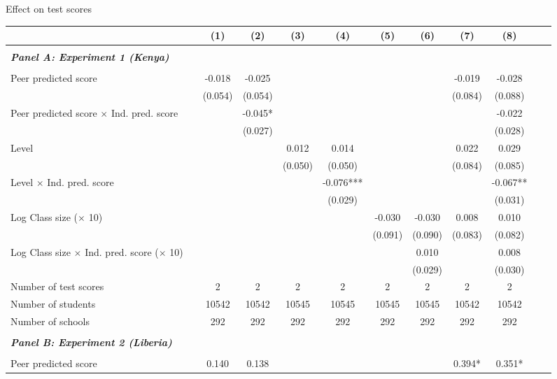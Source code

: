 \begin{center} 
\caption{\small Effect on test scores} 
\label{tab:descriptives} 
\begin{scriptsize}
\begin{threeparttable}
\begin{tabular} {@{} l l c c c c c c c c c c  @{}} \toprule \toprule
& &(1)&(2)&(3)&(4)&(5)&(6)&(7)&(8) \\ \midrule 
\\
\multicolumn{3}{l}{\textbf{\textit{Panel A: Experiment 1 (Kenya)}}} \\
\\
Peer predicted score &  & -0.018 & -0.025 &  &  &  &  & -0.019 & -0.028 \\
                 &  & (0.054) & (0.054) &  &  &  &  & (0.084) & (0.088) \\
Peer predicted score $\times$ Ind. pred. score &  &  & -0.045* &  &  &  &  &  & -0.022 \\
                 &  &  & (0.027) &  &  &  &  &  & (0.028) \\
Level &  &  &  & 0.012 & 0.014 &  &  & 0.022 & 0.029 \\
                 &  &  &  & (0.050) & (0.050) &  &  & (0.084) & (0.085) \\
Level $\times$ Ind. pred. score &  &  &  &  & -0.076*** &  &  &  & -0.067** \\
                 &  &  &  &  & (0.029) &  &  &  & (0.031) \\
Log Class size ($\times$ 10) &  &  &  &  &  & -0.030 & -0.030 & 0.008 & 0.010 \\
                 &  &  &  &  &  & (0.091) & (0.090) & (0.083) & (0.082) \\
Log Class size $\times$ Ind. pred. score ($\times$ 10) &  &  &  &  &  &  & 0.010 &  & 0.008 \\
                 &  &  &  &  &  &  & (0.029) &  & (0.030) \\
\midrule
Number of test scores &  & 2 & 2 & 2 & 2 & 2 & 2 & 2 & 2 \\
Number of students &  & 10542 & 10542 & 10545 & 10545 & 10545 & 10545 & 10542 & 10542 \\
Number of schools &  & 292 & 292 & 292 & 292 & 292 & 292 & 292 & 292 \\
 \midrule
\\
\multicolumn{3}{l}{\textbf{\textit{Panel B: Experiment 2 (Liberia)}}} \\
\\
Peer predicted score &  & 0.140 & 0.138 &  &  &  &  & 0.394* & 0.351* \\

\end{tabular}
\end{threeparttable}
\end{scriptsize}
\end{center}
